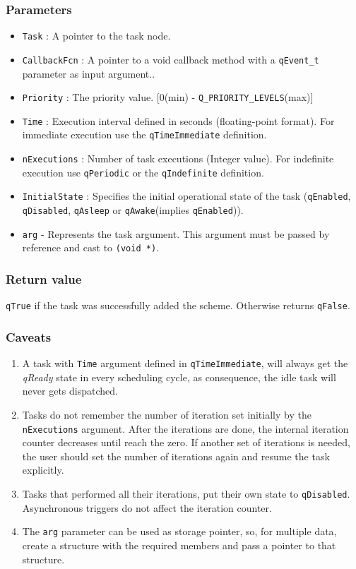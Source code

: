 \subsubsection*{Parameters}
\begin{itemize}
    \item \lstinline{Task} : A pointer to the task node. 
    \item \lstinline{CallbackFcn} : A pointer to a void callback method with a \lstinline{qEvent_t} parameter as input argument..
    \item \lstinline{Priority} : The priority value. [0(min) - \lstinline{Q_PRIORITY_LEVELS}(max)]
    \item \lstinline{Time} : Execution interval defined in seconds (floating-point format). For immediate execution use the  \lstinline{qTimeImmediate} definition. 
    \item \lstinline{nExecutions} : Number of task executions (Integer value). For indefinite execution  use \lstinline{qPeriodic} or the \lstinline{qIndefinite} definition. 
    \item \lstinline{InitialState} : Specifies the initial operational state of the task (\lstinline{qEnabled}, \lstinline{qDisabled}, \lstinline{qAsleep} or \lstinline{qAwake}(implies \lstinline{qEnabled})).
    \item \lstinline{arg} - Represents the task argument. This argument must be passed by reference and cast to \lstinline{(void *)}. 
\end{itemize}

\subsubsection*{Return value}
\lstinline{qTrue} if the task was successfully added the scheme. Otherwise returns \lstinline{qFalse}.

\subsubsection*{Caveats}
\begin{enumerate}
    \item A task with \lstinline{Time} argument defined in \lstinline{qTimeImmediate}, will always get the \textit{qReady} state in every scheduling cycle, as consequence, the idle task will never gets dispatched.
    \item Tasks do not remember the number of iteration set initially by the \lstinline{nExecutions} argument. After the iterations are done, the internal iteration counter decreases until reach the zero. If another set of iterations is needed, the user should set the number of iterations again and resume the task explicitly. 
    \item Tasks that performed all their iterations, put their own state to \lstinline{qDisabled}. Asynchronous triggers do not affect the iteration counter.
    \item The \lstinline{arg} parameter can be used as storage pointer, so, for multiple data, create a structure with the required members and pass a pointer to that structure.
\end{enumerate}

